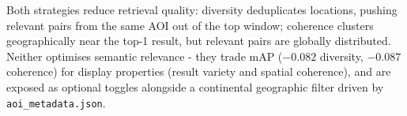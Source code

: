 \documentclass{article}
\begin{document}
Both strategies reduce retrieval quality: diversity deduplicates locations,
pushing relevant pairs from the same AOI out of the top window; coherence clusters
geographically near the top-1 result, but relevant pairs are globally distributed.
Neither optimises semantic relevance - they trade mAP ($-0.082$ diversity,
$-0.087$ coherence) for display properties (result variety and spatial coherence),
and are exposed as optional toggles alongside a continental geographic filter
driven by \texttt{aoi\_metadata.json}.




\end{document}
